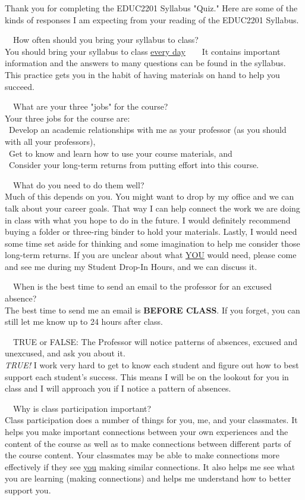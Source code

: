 \documentclass{report}
\newcommand{\QandA}[2]{
	\noindent\faDoubleAngleRight\textsf{~~#1}\\#2\\
	\bigskip
}
\begin{document}
\noindent \textsf{Thank you for completing the EDUC2201 Syllabus "Quiz." Here are some of the kinds of responses I am expecting from your reading of the EDUC2201 Syllabus.}

\bigskip

\QandA{How often should you bring your syllabus to class?}{You should bring your syllabus to class \underline{every day}~~\faSmile~~It contains important information and the answers to many questions can be found in the syllabus. This practice gets you in the habit of having materials on hand to help you succeed.}

\QandA{What are your three "jobs" for the course?}{Your three jobs for the course are:\\ \indent \faHandLeft~Develop an academic relationships with me as your professor (as you should with all your professors),\\ \indent \faHandLeft~Get to know and learn how to use your course materials, and \\ \indent \faHandLeft~Consider your long-term returns from putting effort into this course.}

\QandA{What do you need to do them well?}{Much of this depends on you. You might want to drop by my office and we can talk about your career goals. That way I can help connect the work we are doing in class with what you hope to do in the future. I would definitely recommend buying a folder or three-ring binder to hold your materials. Lastly, I would need some time set aside for thinking and some imagination to help me consider those long-term returns. If you are unclear about what \underline{YOU} would need, please come and see me during my Student Drop-In Hours, and we can discuss it.}

\QandA{When is the best time to send an email to the professor for an excused absence?}{The best time to send me an email is \textbf{BEFORE CLASS}. If you forget, you can still let me know up to 24 hours after class.}

\QandA{TRUE or FALSE: The Professor will notice patterns of absences, excused and unexcused, and ask you about it.}{\emph{TRUE!} I work very hard to get to know each student and figure out how to best support each student's success. This means I will be on the lookout for you in class and I will approach you if I notice a pattern of absences.}

\QandA{Why is class participation important?}{Class participation does a number of things for you, me, and your classmates. It helps you make important connections between your own experiences and the content of the course as well as to make connections between different parts of the course content. Your classmates may be able to make connections more effectively if they see \underline{you} making similar connections. It also helps me see what you are learning (making connections) and helps me understand how to better support you.}
\end{document}
